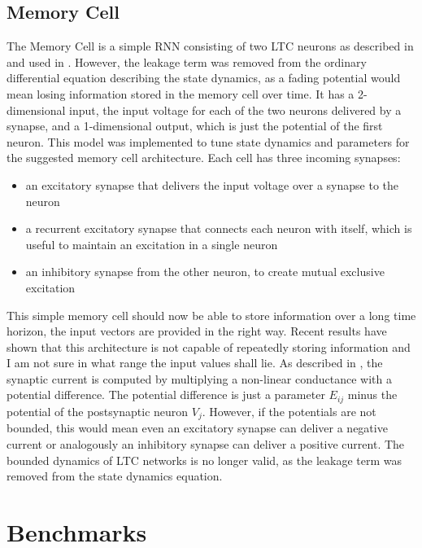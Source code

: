 \documentclass[draft,final]{vutinfth} %
\begin{document}
    \section{Memory Cell} \label{Memory Cell}
    The Memory Cell is a simple RNN consisting of two LTC neurons as described in \cite{LTCNetworks} and used in \cite{NCP}.
    However, the leakage term was removed from the ordinary differential equation describing the state dynamics, as a fading potential would mean losing information stored in the memory cell over time.
    It has a 2-dimensional input, the input voltage for each of the two neurons delivered by a synapse, and a 1-dimensional output, which is just the potential of the first neuron.
    This model was implemented to tune state dynamics and parameters for the suggested memory cell architecture.
    Each cell has three incoming synapses:
    \begin{itemize}
        \item{}
        an excitatory synapse that delivers the input voltage over a synapse to the neuron
        \item{}
        a recurrent excitatory synapse that connects each neuron with itself, which is useful to maintain an excitation in a single neuron
        \item{}
        an inhibitory synapse from the other neuron, to create mutual exclusive excitation
    \end{itemize}
    This simple memory cell should now be able to store information over a long time horizon, the input vectors are provided in the right way.
    Recent results have shown that this architecture is not capable of repeatedly storing information and I am not sure in what range the input values shall lie.
    As described in \cite{LTCNetworks}, the synaptic current is computed by multiplying a non-linear conductance with a potential difference.
    The potential difference is just a parameter $E_{ij}$ minus the potential of the postsynaptic neuron $V_j$.
    However, if the potentials are not bounded, this would mean even an excitatory synapse can deliver a negative current or analogously an inhibitory synapse can deliver a positive current.
    The bounded dynamics of LTC networks is no longer valid, as the leakage term was removed from the state dynamics equation.

    \chapter{Benchmarks}
\end{document}
